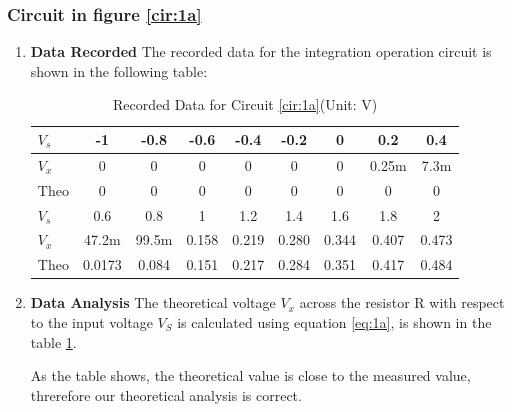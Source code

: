     \subsubsection{Circuit in figure \ref{cir:1a}}
        \begin{enumerate}[I]
            \item \textbf{Data Recorded}\newline
                The recorded data for the integration operation circuit is shown in the following table:
                \begin{table}[H]
                    \centering
                    \begin{tabular}{l|cccccccc}
                        \toprule
                        $V_s$ & -1     & -0.8  & -0.6  & -0.4  & -0.2  & 0     & 0.2   & 0.4   \\ 
                        \midrule
                        $V_x$ & 0      & 0     & 0     & 0     & 0     & 0     & 0.25m & 7.3m  \\
                        Theo  & 0      & 0     & 0     & 0     & 0     & 0     & 0     & 0     \\
                        \bottomrule
                        \toprule
                        $V_s$ & 0.6    & 0.8   & 1     & 1.2   & 1.4   & 1.6   & 1.8   & 2     \\
                        \midrule
                        $V_x$ & 47.2m  & 99.5m & 0.158 & 0.219 & 0.280 & 0.344 & 0.407 & 0.473 \\
                        Theo  & 0.0173 & 0.084 & 0.151 & 0.217 & 0.284 & 0.351 & 0.417 & 0.484 \\
                        \bottomrule
                        \end{tabular}
                    \caption{Recorded Data for Circuit \ref{cir:1a}(Unit: V)}
                    \label{tab:1a}
                \end{table}
            \item \textbf{Data Analysis}\newline
                The theoretical voltage $V_x$ across the resistor R with respect to the input voltage $V_S$ is calculated using equation \ref{eq:1a}, is shown in the table \ref{tab:1a}.\par
                
                As the table shows, the theoretical value is close to the measured value, threrefore our theoretical analysis is correct.
        \end{enumerate}

